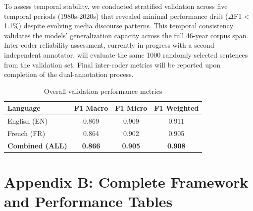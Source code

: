 To assess temporal stability, we conducted stratified validation across five temporal periods (1980s-2020s) that revealed minimal performance drift ($\Delta$F1 < 1.1\%) despite evolving media discourse patterns. This temporal consistency validates the models' generalization capacity across the full 46-year corpus span. Inter-coder reliability assessment, currently in progress with a second independent annotator, will evaluate the same 1000 randomly selected sentences from the validation set. Final inter-coder metrics will be reported upon completion of the dual-annotation process.

\begin{table}[h!]
\centering
\caption{Overall validation performance metrics}
\label{tab:final_validation_metrics}
\begin{tabular}{lccc}
\toprule
\textbf{Language} & \textbf{F1 Macro} & \textbf{F1 Micro} & \textbf{F1 Weighted} \\
\midrule
English (EN) & 0.869 & 0.909 & 0.911 \\
French (FR) & 0.864 & 0.902 & 0.905 \\
\midrule
\textbf{Combined (ALL)} & \textbf{0.866} & \textbf{0.905} & \textbf{0.908} \\
\bottomrule
\end{tabular}
\end{table}

\section{Appendix B: Complete Framework and Performance Tables}
\label{sec:appendix_tables}
\setcounter{table}{0}  %
\renewcommand{\thetable}{B\arabic{table}}  %
\renewcommand\theHtable{AppendixB.\thetable}  %

